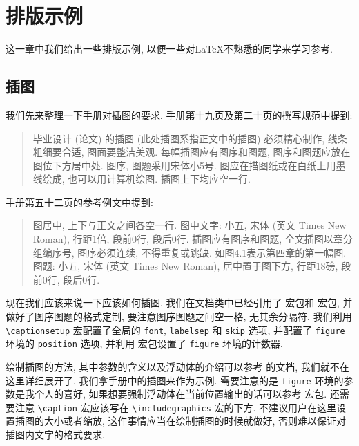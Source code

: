 
\section{排版示例}

这一章中我们给出一些排版示例, 以便一些对\LaTeX 不熟悉的同学来学习参考.

\subsection{插图}

我们先来整理一下手册对插图的要求. 手册第十九页及第二十页的撰写规范中提到:
\begin{quote}
  毕业设计 (论文) 的插图 (此处插图系指正文中的插图) 必须精心制作, 线条粗细要合适, 图面要整洁美观. 每幅插图应有图序和图题, 图序和图题应放在图位下方居中处. 图序, 图题采用宋体小5号. 图应在描图纸或在白纸上用墨线绘成, 也可以用计算机绘图. 插图上下均应空一行.
\end{quote}
手册第五十二页的参考例文中提到:
\begin{quote}
  图居中, 上下与正文之间各空一行.
  图中文字: 小五, 宋体 (英文 Times New Roman), 行距1倍, 段前0行, 段后0行.
  插图应有图序和图题, 全文插图以章分组编序号, 图序必须连续, 不得重复或跳缺. 如图4.1表示第四章的第一幅图.
  图题: 小五, 宋体 (英文 Times New Roman), 居中置于图下方, 行距18磅, 段前0行, 段后0行.
\end{quote}

现在我们应该来说一下应该如何插图. 我们在文档类中已经引用了  宏包\footnotemark 和  宏包, 并做好了图序图题的格式定制, 要注意图序图题之间空一格, 无其余分隔符. 我们利用 \verb|\captionsetup| 宏配置了全局的 \verb|font|, \verb|labelsep| 和 \verb|skip| 选项, 并配置了 \verb|figure| 环境的 \verb|position| 选项, 并利用  宏包设置了 \verb|figure| 环境的计数器.

绘制插图的方法, 其中参数的含义以及浮动体的介绍可以参考  的文档, 我们就不在这里详细展开了. 我们拿手册中的插图来作为示例. 需要注意的是 \verb|figure| 环境的参数是我个人的喜好, 如果想要强制浮动体在当前位置输出的话可以参考  宏包. 还需要注意 \verb|\caption| 宏应该写在 \verb|\includegraphics| 宏的下方. 不建议用户在这里设置插图的大小或者缩放, 这件事情应当在绘制插图的时候就做好, 否则难以保证对插图内文字的格式要求.

